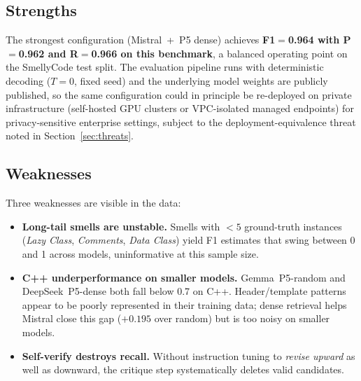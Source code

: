 \documentclass[conference]{IEEEtran}
\begin{document}
\subsection{Strengths}
The strongest configuration (Mistral~+~P5 dense) achieves \textbf{F1$=$0.964
with P$=$0.962 and R$=$0.966 on this benchmark}, a balanced operating point
on the SmellyCode test split. The evaluation pipeline runs with
deterministic decoding ($T{=}0$, fixed seed) and the underlying model
weights are publicly published, so the same configuration could in
principle be re-deployed on private infrastructure (self-hosted GPU
clusters or VPC-isolated managed endpoints) for privacy-sensitive enterprise
settings, subject to the deployment-equivalence threat noted in
Section~\ref{sec:threats}.

\subsection{Weaknesses}
Three weaknesses are visible in the data:
\begin{itemize}
 \item \textbf{Long-tail smells are unstable.} Smells with $<5$ ground-truth
 instances (\textit{Lazy Class}, \textit{Comments}, \textit{Data Class})
 yield F1 estimates that swing between 0 and 1 across models, uninformative
 at this sample size.
 \item \textbf{C++ underperformance on smaller models.} Gemma~P5-random and
 DeepSeek~P5-dense both fall below 0.7 on C++. Header/template patterns
 appear to be poorly represented in their training data; dense retrieval
 helps Mistral close this gap ($+0.195$ over random) but is too noisy on
 smaller models.
 \item \textbf{Self-verify destroys recall.} Without instruction tuning to
 \emph{revise upward} as well as downward, the critique step systematically
 deletes valid candidates.
\end{itemize}
\end{document}
